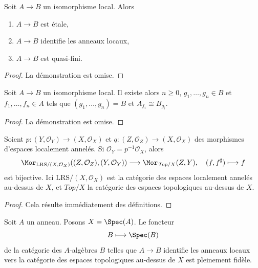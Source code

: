 \begin{lemma}
\label{lemma-local-isomorphism-implies}
Soit $A \to B$ un isomorphisme local. Alors
\begin{enumerate}
\item $A \to B$ est \'etale,
\item $A \to B$ identifie les anneaux locaux,
\item $A \to B$ est quasi-fini.
\end{enumerate}
\end{lemma}

\begin{proof}
La d\'emonstration est omise.
\end{proof}

\begin{lemma}
\label{lemma-structure-local-isomorphism}
Soit $A \to B$ un isomorphisme local. Il existe alors $n \geq 0$,
$g_1, \ldots, g_n \in B$ et $f_1, \ldots, f_n \in A$ tels que
$(g_1, \ldots, g_n) = B$ et $A_{f_i} \cong B_{g_i}$.
\end{lemma}

\begin{proof}
La d\'emonstration est omise.
\end{proof}

\begin{lemma}
\label{lemma-fully-faithful-spaces-over-X}
Soient $p : (Y, \mathcal{O}_Y) \to (X, \mathcal{O}_X)$ et
$q : (Z, \mathcal{O}_Z) \to (X, \mathcal{O}_X)$
des morphismes d'espaces localement annel\'es.
Si $\mathcal{O}_Y = p^{-1}\mathcal{O}_X$, alors
$$
\Mor_{\text{LRS}/(X, \mathcal{O}_X)}((Z, \mathcal{O}_Z), (Y, \mathcal{O}_Y))
\longrightarrow
\Mor_{\textit{Top}/X}(Z, Y),\quad
(f, f^\sharp) \longmapsto f
$$
est bijective. Ici $\text{LRS}/(X, \mathcal{O}_X)$ est la cat\'egorie des
espaces localement annel\'es au-dessus de $X$, et $\textit{Top}/X$ la cat\'egorie
des espaces topologiques au-dessus de $X$.
\end{lemma}

\begin{proof}
Cela r\'esulte imm\'ediatement des d\'efinitions.
\end{proof}

\begin{lemma}
\label{lemma-local-isomorphism-fully-faithful}
Soit $A$ un anneau. Posons $X = \Spec(A)$. Le foncteur
$$
B \longmapsto \Spec(B)
$$
de la cat\'egorie des $A$-alg\`ebres $B$ telles que $A \to B$ identifie
les anneaux locaux vers la cat\'egorie des
espaces topologiques au-dessus de $X$ est pleinement fid\`ele.
\end{lemma}

